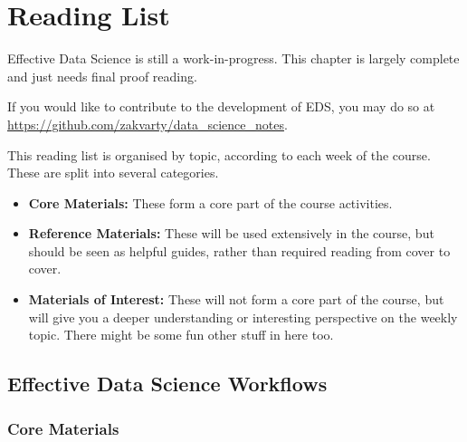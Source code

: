 \documentclass[
  letterpaper,
  DIV=11,
  numbers=noendperiod]{scrreprt}
\begin{document}
\cleardoublepage
{}
{}
\appendix

\chapter{Reading List}\label{reading-list}

\begin{tcolorbox}[enhanced jigsaw, coltitle=black, opacityback=0, left=2mm, titlerule=0mm, breakable, colback=white, opacitybacktitle=0.6, colbacktitle=quarto-callout-note-color!10!white, bottomtitle=1mm, toptitle=1mm, colframe=quarto-callout-note-color-frame, bottomrule=.15mm, leftrule=.75mm, title=\textcolor{quarto-callout-note-color}{\faInfo}\hspace{0.5em}{Note}, toprule=.15mm, arc=.35mm, rightrule=.15mm]

Effective Data Science is still a work-in-progress. This chapter is
largely complete and just needs final proof reading.

If you would like to contribute to the development of EDS, you may do so
at \url{https://github.com/zakvarty/data_science_notes}.

\end{tcolorbox}

This reading list is organised by topic, according to each week of the
course. These are split into several categories.

\begin{itemize}
\item
  \textbf{Core Materials:} These form a core part of the course
  activities.
\item
  \textbf{Reference Materials:} These will be used extensively in the
  course, but should be seen as helpful guides, rather than required
  reading from cover to cover.
\item
  \textbf{Materials of Interest:} These will not form a core part of the
  course, but will give you a deeper understanding or interesting
  perspective on the weekly topic. There might be some fun other stuff
  in here too.
\end{itemize}

\section{Effective Data Science Workflows}\label{workflows-reading}

\subsection*{Core Materials}\label{core-materials}
\end{document}
